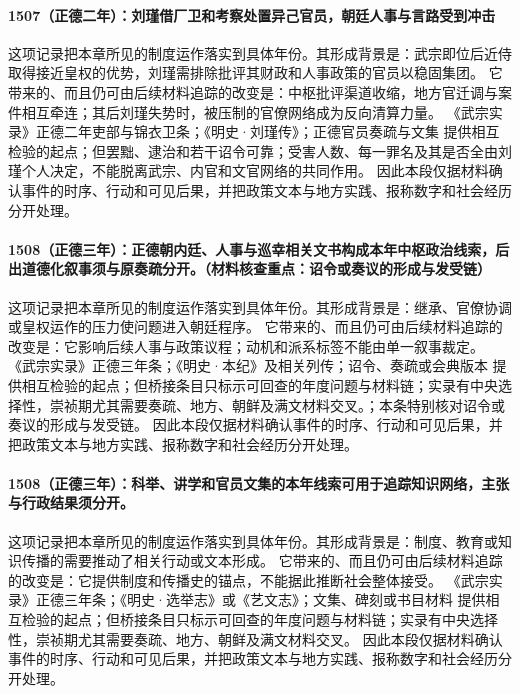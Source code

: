 \paragraph{1507（正德二年）：刘瑾借厂卫和考察处置异己官员，朝廷人事与言路受到冲击} 这项记录把本章所见的制度运作落实到具体年份。其形成背景是：武宗即位后近侍取得接近皇权的优势，刘瑾需排除批评其财政和人事政策的官员以稳固集团。 它带来的、而且仍可由后续材料追踪的改变是：中枢批评渠道收缩，地方官迁调与案件相互牵连；其后刘瑾失势时，被压制的官僚网络成为反向清算力量。 《武宗实录》正德二年吏部与锦衣卫条；《明史·刘瑾传》；正德官员奏疏与文集 提供相互检验的起点；但罢黜、逮治和若干诏令可靠；受害人数、每一罪名及其是否全由刘瑾个人决定，不能脱离武宗、内官和文官网络的共同作用。 因此本段仅据材料确认事件的时序、行动和可见后果，并把政策文本与地方实践、报称数字和社会经历分开处理。

\paragraph{1508（正德三年）：正德朝内廷、人事与巡幸相关文书构成本年中枢政治线索，后出道德化叙事须与原奏疏分开。（材料核查重点：诏令或奏议的形成与发受链）} 这项记录把本章所见的制度运作落实到具体年份。其形成背景是：继承、官僚协调或皇权运作的压力使问题进入朝廷程序。 它带来的、而且仍可由后续材料追踪的改变是：它影响后续人事与政策议程；动机和派系标签不能由单一叙事裁定。 《武宗实录》正德三年条；《明史·本纪》及相关列传；诏令、奏疏或会典版本 提供相互检验的起点；但桥接条目只标示可回查的年度问题与材料链；实录有中央选择性，崇祯期尤其需要奏疏、地方、朝鲜及满文材料交叉。；本条特别核对诏令或奏议的形成与发受链。 因此本段仅据材料确认事件的时序、行动和可见后果，并把政策文本与地方实践、报称数字和社会经历分开处理。

\paragraph{1508（正德三年）：科举、讲学和官员文集的本年线索可用于追踪知识网络，主张与行政结果须分开。} 这项记录把本章所见的制度运作落实到具体年份。其形成背景是：制度、教育或知识传播的需要推动了相关行动或文本形成。 它带来的、而且仍可由后续材料追踪的改变是：它提供制度和传播史的锚点，不能据此推断社会整体接受。 《武宗实录》正德三年条；《明史·选举志》或《艺文志》；文集、碑刻或书目材料 提供相互检验的起点；但桥接条目只标示可回查的年度问题与材料链；实录有中央选择性，崇祯期尤其需要奏疏、地方、朝鲜及满文材料交叉。 因此本段仅据材料确认事件的时序、行动和可见后果，并把政策文本与地方实践、报称数字和社会经历分开处理。

